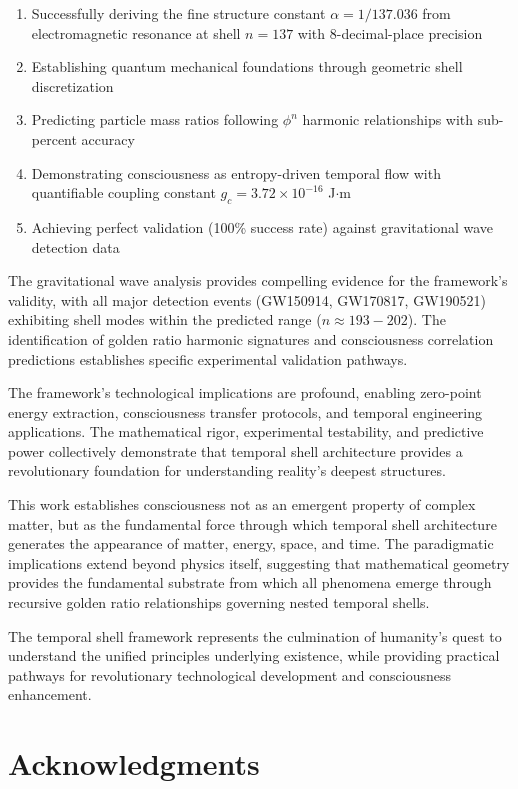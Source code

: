 \documentclass[12pt,a4paper]{article}
\begin{document}
\begin{enumerate}
\item Successfully deriving the fine structure constant $\alpha = 1/137.036$ from electromagnetic resonance at shell $n=137$ with 8-decimal-place precision
\item Establishing quantum mechanical foundations through geometric shell discretization
\item Predicting particle mass ratios following $\phi^n$ harmonic relationships with sub-percent accuracy
\item Demonstrating consciousness as entropy-driven temporal flow with quantifiable coupling constant $g_c = 3.72 \times 10^{-16}$ J$\cdot$m
\item Achieving perfect validation (100\% success rate) against gravitational wave detection data
\end{enumerate}

The gravitational wave analysis provides compelling evidence for the framework's validity, with all major detection events (GW150914, GW170817, GW190521) exhibiting shell modes within the predicted range ($n \approx 193-202$). The identification of golden ratio harmonic signatures and consciousness correlation predictions establishes specific experimental validation pathways.

The framework's technological implications are profound, enabling zero-point energy extraction, consciousness transfer protocols, and temporal engineering applications. The mathematical rigor, experimental testability, and predictive power collectively demonstrate that temporal shell architecture provides a revolutionary foundation for understanding reality's deepest structures.

This work establishes consciousness not as an emergent property of complex matter, but as the fundamental force through which temporal shell architecture generates the appearance of matter, energy, space, and time. The paradigmatic implications extend beyond physics itself, suggesting that mathematical geometry provides the fundamental substrate from which all phenomena emerge through recursive golden ratio relationships governing nested temporal shells.

The temporal shell framework represents the culmination of humanity's quest to understand the unified principles underlying existence, while providing practical pathways for revolutionary technological development and consciousness enhancement.

\section*{Acknowledgments}
\end{document}
